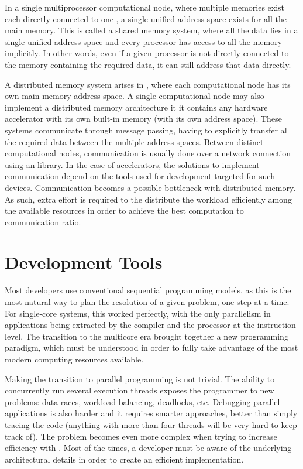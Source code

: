 \documentclass[../thesis]{subfiles}
\begin{document}
		In a single multiprocessor computational node, where multiple memories exist each directly connected to one \cpu, a single unified address space exists for all the main memory. This is called a shared memory system, where all the data lies in a single unified address space and every processor has access to all the memory implicitly. In other words, even if a given processor is not directly connected to the memory containing the required data, it can still address that data directly.

		A distributed memory system arises in \hetplats, where each computational node has its own main memory address space. A single computational node may also implement a distributed memory architecture it it contains any hardware accelerator with its own built-in memory (with its own address space). These systems communicate through message passing, having to explicitly transfer all the required data between the multiple address spaces. Between distinct computational nodes, communication is usually done over a network connection using an \mpi library. In the case of accelerators, the solutions to implement communication depend on the tools used for development targeted for such devices. Communication becomes a possible bottleneck with distributed memory. As such, extra effort is required to the distribute the workload efficiently among the available resources in order to achieve the best computation to communication ratio.

		\section{Development Tools}
		Most developers use conventional sequential programming models, as this is the most natural way to plan the resolution of a given problem, one step at a time. For single-core systems, this worked perfectly, with the only parallelism in applications being extracted by the compiler and the processor at the instruction level. The transition to the multicore era brought together a new programming paradigm, which must be understood in order to fully take advantage of the most modern computing resources available.

		Making the transition to parallel programming is not trivial. The ability to concurrently run several execution threads exposes the programmer to new problems: data races, workload balancing, deadlocks, etc. Debugging parallel applications is also harder and it requires smarter approaches, better than simply tracing the code (anything with more than four threads will be very hard to keep track of). The problem becomes even more complex when trying to increase efficiency with \hetplats. Most of the times, a developer must be aware of the underlying architectural details in order to create an efficient implementation.
\end{document}

